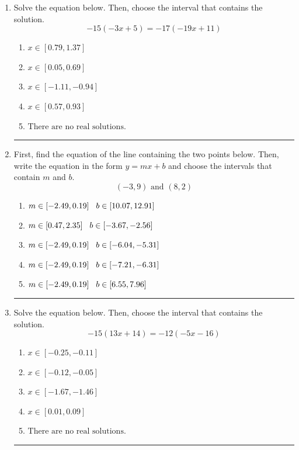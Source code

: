 \documentclass[14pt]{extbook}
\newcommand{\litem}[1]{\item#1\hspace*{-1cm}\rule{\textwidth}{0.4pt}}
\begin{document}
\begin{enumerate}
{\begin{enumerate}[label=\Alph*.]
\end{enumerate} }
\litem{
Solve the equation below. Then, choose the interval that contains the solution.\[ -15(-3x + 5) = -17(-19x + 11) \]\begin{enumerate}[label=\Alph*.]
\item \( x \in [0.79, 1.37] \)
\item \( x \in [0.05, 0.69] \)
\item \( x \in [-1.11, -0.94] \)
\item \( x \in [0.57, 0.93] \)
\item \( \text{There are no real solutions.} \)

\end{enumerate} }
\litem{
First, find the equation of the line containing the two points below. Then, write the equation in the form $ y=mx+b $ and choose the intervals that contain $m$ and $b$.\[ (-3, 9) \text{ and } (8, 2) \]\begin{enumerate}[label=\Alph*.]
\item \( m \in [-2.49, 0.19] \hspace*{3mm} b \in [10.07, 12.91] \)
\item \( m \in [0.47, 2.35] \hspace*{3mm} b \in [-3.67, -2.56] \)
\item \( m \in [-2.49, 0.19] \hspace*{3mm} b \in [-6.04, -5.31] \)
\item \( m \in [-2.49, 0.19] \hspace*{3mm} b \in [-7.21, -6.31] \)
\item \( m \in [-2.49, 0.19] \hspace*{3mm} b \in [6.55, 7.96] \)

\end{enumerate} }
\litem{
Solve the equation below. Then, choose the interval that contains the solution.\[ -15(13x + 14) = -12(-5x -16) \]\begin{enumerate}[label=\Alph*.]
\item \( x \in [-0.25, -0.11] \)
\item \( x \in [-0.12, -0.05] \)
\item \( x \in [-1.67, -1.46] \)
\item \( x \in [0.01, 0.09] \)
\item \( \text{There are no real solutions.} \)

\end{enumerate} }
\end{enumerate}
\end{document}
